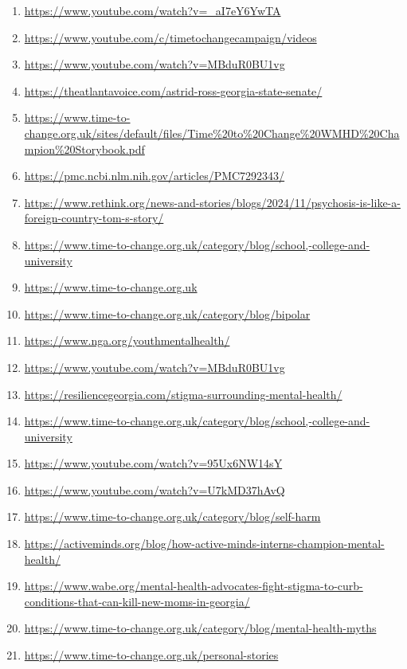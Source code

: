 \documentclass[10pt,a4paper]{article}
\begin{document}
\begin{enumerate}[leftmargin=*]
            \item \url{ https://www.youtube.com/watch?v=\_aI7eY6YwTA }
            \item \url{ https://www.youtube.com/c/timetochangecampaign/videos }
            \item \url{ https://www.youtube.com/watch?v=MBduR0BU1vg }
            \item \url{ https://theatlantavoice.com/astrid-ross-georgia-state-senate/ }
            \item \url{ https://www.time-to-change.org.uk/sites/default/files/Time\%20to\%20Change\%20WMHD\%20Champion\%20Storybook.pdf }
            \item \url{ https://pmc.ncbi.nlm.nih.gov/articles/PMC7292343/ }
            \item \url{ https://www.rethink.org/news-and-stories/blogs/2024/11/psychosis-is-like-a-foreign-country-tom-s-story/ }
            \item \url{ https://www.time-to-change.org.uk/category/blog/school,-college-and-university }
            \item \url{ https://www.time-to-change.org.uk }
            \item \url{ https://www.time-to-change.org.uk/category/blog/bipolar }
            \item \url{ https://www.nga.org/youthmentalhealth/ }
            \item \url{ https://www.youtube.com/watch?v=MBduR0BU1vg }
            \item \url{ https://resiliencegeorgia.com/stigma-surrounding-mental-health/ }
            \item \url{ https://www.time-to-change.org.uk/category/blog/school,-college-and-university }
            \item \url{ https://www.youtube.com/watch?v=95Ux6NW14sY }
            \item \url{ https://www.youtube.com/watch?v=U7kMD37hAvQ }
            \item \url{ https://www.time-to-change.org.uk/category/blog/self-harm }
            \item \url{ https://activeminds.org/blog/how-active-minds-interns-champion-mental-health/ }
            \item \url{ https://www.wabe.org/mental-health-advocates-fight-stigma-to-curb-conditions-that-can-kill-new-moms-in-georgia/ }
            \item \url{ https://www.time-to-change.org.uk/category/blog/mental-health-myths }
            \item \url{ https://www.time-to-change.org.uk/personal-stories }

\end{enumerate}
\end{document}
